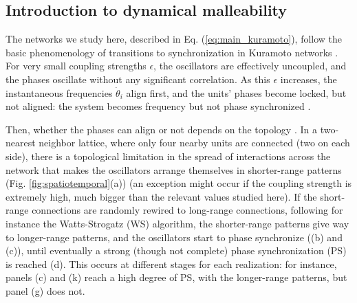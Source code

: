 \subsection{Introduction to dynamical malleability}
The networks we study here, described in Eq. (\ref{eq:main_kuramoto}), follow the basic phenomenology of transitions to synchronization in Kuramoto networks \cite{kuramoto1975self, acebron2005kuramoto}.
For very small coupling strengths $\epsilon$, the oscillators are effectively uncoupled, and the phases oscillate without any significant correlation. As this $\epsilon$ increases, the instantaneous frequencies $\dot{\theta}_i$ align first, and the units' phases become locked, but not aligned: the system becomes frequency but not phase synchronized \cite{pikovsky2001synchronization}. 

Then, whether the phases can align or not depends on the topology \cite{medvedev2014small, hong2002synchronization}. In a two-nearest neighbor lattice, where only four nearby units are connected (two on each side), there is a topological limitation in the spread of interactions across the network that makes the oscillators arrange themselves in shorter-range patterns (Fig. \ref{fig:spatiotemporal}(a)) (an exception might occur if the coupling strength is extremely high, much bigger than the relevant values studied here).
If the short-range connections are randomly rewired to long-range connections, following for instance the Watts-Strogatz (WS) algorithm, the shorter-range patterns give way to longer-range patterns, and the oscillators start to phase synchronize ((b) and (c)), until eventually a strong (though not complete) phase synchronization (PS) is reached (d). This occurs at different stages for each realization: for instance, panels (c) and (k) reach a high degree of PS, with the longer-range patterns, but panel (g) does not. 

